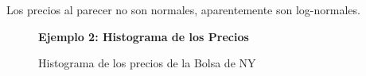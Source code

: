 Los precios al parecer no son normales, aparentemente son log-normales.\\
\begin{figure}[H]
	\centering
	\textbf{Ejemplo 2: Histograma de los Precios}\par\medskip
	\caption{Histograma de los precios de la Bolsa de NY}\label{figura3}
\end{figure}

